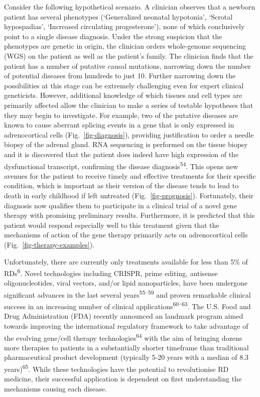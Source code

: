 \documentclass[
sn-nature
]{sn-jnl}
\begin{document}
Consider the following hypothetical scenario. A clinician observes that
a newborn patient has several phenotypes (`Generalized neonatal
hypotonia', `Scrotal hypospadias', `Increased circulating
progesterone'), none of which conclusively point to a single disease
diagnosis. Under the strong suspicion that the phenotypes are genetic in
origin, the clinician orders whole-genome sequencing (WGS) on the
patient as well as the patient's family. The clinician finds that the
patient has a number of putative causal mutations, narrowing down the
number of potential diseases from hundreds to just 10. Further narrowing
down the possibilities at this stage can be extremely challenging even
for expert clinical geneticists. However, additional knowledge of which
tissues and cell types are primarily affected allow the clinician to
make a series of testable hypotheses that they may begin to investigate.
For example, two of the putative diseases are known to cause aberrant
splicing events in a gene that is only expressed in adrenocortical cells
(Fig.~\ref{fig-diagnosis}), providing justification to order a needle
biopsy of the adrenal gland. RNA sequencing is performed on the tissue
biopsy and it is discovered that the patient does indeed have high
expression of the dysfunctional transcript, confirming the disease
diagnosis\textsuperscript{54}. This opens new avenues for the patient to
receive timely and effective treatments for their specific condition,
which is important as their version of the disease tends to lead to
death in early childhood if left untreated (Fig.~\ref{fig-prognosis}).
Fortunately, their diagnosis now qualifies them to participate in a
clinical trial of a novel gene therapy with promising preliminary
results. Furthermore, it is predicted that this patient would respond
especially well to this treatment given that the mechanisms of action of
the gene therapy primarily acts on adrenocortical cells
(Fig.~\ref{fig-therapy-examples}).

Unfortunately, there are currently only treatments available for less
than 5\% of RDs\textsuperscript{6}. Novel technologies including CRISPR,
prime editing, antisense oligonucleotides, viral vectors, and/or lipid
nanoparticles, have been undergone significant advances in the last
several years\textsuperscript{55--59} and proven remarkable clinical
success in an increasing number of clinical
applications\textsuperscript{60--63}. The U.S. Food and Drug
Administration (FDA) recently announced an landmark program aimed
towards improving the international regulatory framework to take
advantage of the evolving gene/cell therapy
technologies\textsuperscript{64} with the aim of bringing dozens more
therapies to patients in a substantially shorter timeframe than
traditional pharmaceutical product development (typically 5-20 years
with a median of 8.3 years)\textsuperscript{65}. While these
technologies have the potential to revolutionise RD medicine, their
successful application is dependent on first understanding the
mechanisms causing each disease.
\end{document}
